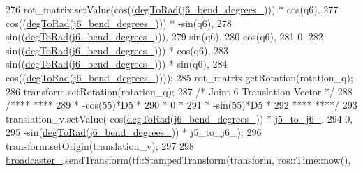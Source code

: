 \begin{DoxyCode}
{{{{{{{{{{{{{{276     rot\_matrix.setValue(cos((\hyperlink{classjaco_1_1JacoKinematics_a340eda126d97aa3700cc5dc8be89aa39}{degToRad}(\hyperlink{classjaco_1_1JacoKinematics_a41a21f1b560c3387855f15059a619994}{j6\_bend\_degrees\_}))) * cos(q6),
277                         cos((\hyperlink{classjaco_1_1JacoKinematics_a340eda126d97aa3700cc5dc8be89aa39}{degToRad}(\hyperlink{classjaco_1_1JacoKinematics_a41a21f1b560c3387855f15059a619994}{j6\_bend\_degrees\_}))) * -sin(q6),
278                         sin((\hyperlink{classjaco_1_1JacoKinematics_a340eda126d97aa3700cc5dc8be89aa39}{degToRad}(\hyperlink{classjaco_1_1JacoKinematics_a41a21f1b560c3387855f15059a619994}{j6\_bend\_degrees\_}))),
279                         sin(q6),
280                         cos(q6),
281                         0,
282                         -sin((\hyperlink{classjaco_1_1JacoKinematics_a340eda126d97aa3700cc5dc8be89aa39}{degToRad}(\hyperlink{classjaco_1_1JacoKinematics_a41a21f1b560c3387855f15059a619994}{j6\_bend\_degrees\_}))) * cos(q6),
283                         sin((\hyperlink{classjaco_1_1JacoKinematics_a340eda126d97aa3700cc5dc8be89aa39}{degToRad}(\hyperlink{classjaco_1_1JacoKinematics_a41a21f1b560c3387855f15059a619994}{j6\_bend\_degrees\_}))) * sin(q6),
284                         cos((\hyperlink{classjaco_1_1JacoKinematics_a340eda126d97aa3700cc5dc8be89aa39}{degToRad}(\hyperlink{classjaco_1_1JacoKinematics_a41a21f1b560c3387855f15059a619994}{j6\_bend\_degrees\_}))));
285     rot\_matrix.getRotation(rotation\_q);
286     transform.setRotation(rotation\_q);
287     \textcolor{comment}{/* Joint 6 Translation Vector */}
288     \textcolor{comment}{/****        ****}
289 \textcolor{comment}{     * -cos(55)*D5  *}
290 \textcolor{comment}{     *       0      *}
291 \textcolor{comment}{     * -sin(55)*D5  *}
292 \textcolor{comment}{     ****       ****/}
293     translation\_v.setValue(-cos(\hyperlink{classjaco_1_1JacoKinematics_a340eda126d97aa3700cc5dc8be89aa39}{degToRad}(\hyperlink{classjaco_1_1JacoKinematics_a41a21f1b560c3387855f15059a619994}{j6\_bend\_degrees\_})) * 
      \hyperlink{classjaco_1_1JacoKinematics_a156f585f21c8495d3772fb872cace39e}{j5\_to\_j6\_},
294                            0,
295                            -sin(\hyperlink{classjaco_1_1JacoKinematics_a340eda126d97aa3700cc5dc8be89aa39}{degToRad}(\hyperlink{classjaco_1_1JacoKinematics_a41a21f1b560c3387855f15059a619994}{j6\_bend\_degrees\_})) * j5\_to\_j6\_);
296     transform.setOrigin(translation\_v);
297 
298     \hyperlink{classjaco_1_1JacoKinematics_a3314f9e6a8fb86405384dd23bd194e46}{broadcaster\_}.sendTransform(tf::StampedTransform(transform, ros::Time::now(),
}}}}}}}}}}}}}}
\end{DoxyCode}
